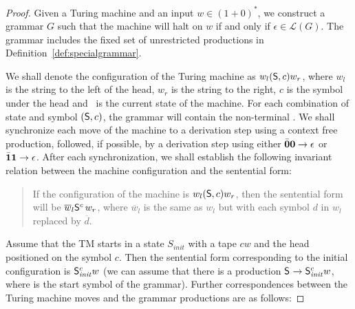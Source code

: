 \documentclass[9pt]{sigplanconf}
\begin{document}
\begin{proof}
Given a  Turing machine  and an input  $w\in (1+0)^*$, we  construct a
grammar $G$  such that  the machine will  halt on  $w$ if and  only if
$\epsilon \in  \mathscr{L}(G)$. The grammar includes the  fixed set of
unrestricted productions  in Definition~\ref{def:specialgrammar}. 

We  shall   denote  the  configuration   of  the  Turing   machine  as
$w_l(\mathsf{S},c)w_r$, where $w_l$ is the string to the left of the head,
$w_r$ is the string to the right, $c$ is the symbol under the head and
\state\ is the current state  of the machine.  For each combination of
state  and   symbol  $(\mathsf{S},c)$,   the  grammar  will   contain  the
non-terminal . We shall synchronize each move of the machine
to a  derivation step  using a context  free production,  followed, if
possible, by  a derivation step  using either $\bar{\mathbf{0}}\mathbf{0}    \rightarrow
\epsilon$ or $\bar{\mathbf{1}}\mathbf{1}    \rightarrow
\epsilon$.
After each synchronization, we shall establish the following invariant
relation between the machine configuration and the  sentential form:

\begin{quote}
  If the configuration of the machine is $w_l(\mathsf{S},c)w_r$, then the
  sentential form will be $\overline{w}_l\mathsf{S}_{}^{c}\,w_r$, where
  $\overline{w}_l$ is the same as $w_l$ but with each symbol $d$ in $w_l$
  replaced by $\overline{d}$.
\end{quote}

Assume that  the TM starts  in a  state $S_\mathit{init}$ with  a tape
$cw$ and  the head positioned on  the symbol $c$. Then  the sentential
form    corresponding     to    the    initial     configuration    is
$\mathsf{S}_{\mathit{init}}^{c}w$ (we  can assume that there  is a production
$\mathsf{S}_{}^{} \rightarrow  \mathsf{S}_{\mathit{init}}^{c}w$, where  \nont{}{} is
the start symbol of the  grammar). Further correspondences between the
Turing machine moves and the grammar productions are as follows:


\end{proof}
\end{document}
